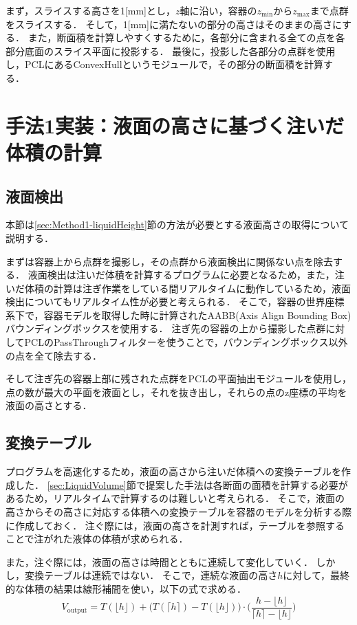 	まず，スライスする高さを1[mm]とし，$z$軸に沿い，容器の$z_\mathrm{min}$から$z_\mathrm{max}$まで点群をスライスする．
	そして，1[mm]に満たないの部分の高さはそのままの高さにする．
	また，断面積を計算しやすくするために，各部分に含まれる全ての点を各部分底面のスライス平面に投影する．
	最後に，投影した各部分の点群を使用し，PCLにあるConvexHullというモジュールで，その部分の断面積を計算する．
		
\section{手法1実装：液面の高さに基づく注いだ体積の計算}
	\subsection{液面検出}\label{sec:pour-level-detect}
	本節は\ref{sec:Method1-liquidHeight}節の方法が必要とする液面高さの取得について説明する．
	
	まずは容器上から点群を撮影し，その点群から液面検出に関係ない点を除去する．
	液面検出は注いだ体積を計算するプログラムに必要となるため，また，注いだ体積の計算は注ぎ作業をしている間リアルタイムに動作しているため，液面検出についてもリアルタイム性が必要と考えられる．
	そこで，容器の世界座標系下で，容器モデルを取得した時に計算されたAABB(Axis Align Bounding Box)バウンディングボックスを使用する．
	注ぎ先の容器の上から撮影した点群に対してPCLのPassThroughフィルターを使うことで，バウンディングボックス以外の点を全て除去する．
	
	そして注ぎ先の容器上部に残された点群をPCLの平面抽出モジュールを使用し，点の数が最大の平面を液面とし，それを抜き出し，それらの点のz座標の平均を液面の高さとする．
	
	\subsection{変換テーブル}\label{sec:Method1-Table}
	プログラムを高速化するため，液面の高さから注いだ体積への変換テーブルを作成した．
	\ref{sec:LiquidVolume}節で提案した手法は各断面の面積を計算する必要があるため，リアルタイムで計算するのは難しいと考えられる．
	そこで，液面の高さからその高さに対応する体積への変換テーブルを容器のモデルを分析する際に作成しておく．
	注ぐ際には，液面の高さを計測すれば，テーブルを参照することで注がれた液体の体積が求められる．
	
	また，注ぐ際には，液面の高さは時間とともに連続して変化していく．
	しかし，変換テーブルは連続ではない．
	そこで，連続な液面の高さ$h$に対して，最終的な体積の結果は線形補間を使い，以下の式で求める．%
	\begin{equation}
	V_\mathrm{output} = T(\lfloor h \rfloor) + \Big(T(\lceil h \rceil ) - T(\lfloor h \rfloor)\Big)\cdot\Big( \frac{h - \lfloor h \rfloor}{\lceil h \rceil  - \lfloor h \rfloor}\Big) \label{exp:Method1-Table}
	\end{equation}

